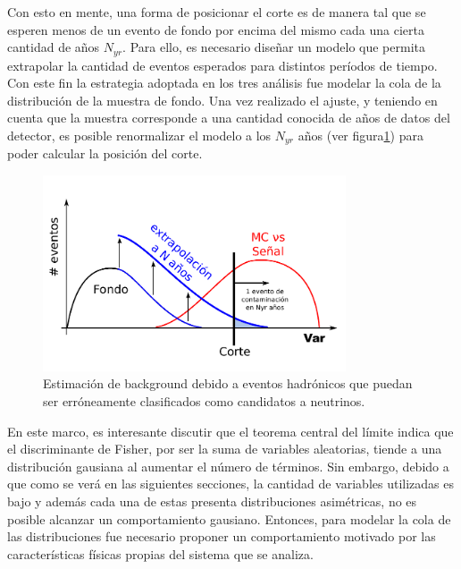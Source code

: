 	Con esto en mente, una forma de posicionar el corte es de manera tal que se esperen menos de un evento de fondo por encima del mismo cada una cierta cantidad de años $N_{yr}$.
	Para ello, es necesario diseñar un modelo que permita extrapolar la cantidad de eventos esperados para distintos períodos de tiempo.
	Con este fin la estrategia adoptada en los tres análisis fue modelar la cola de la distribución de la muestra de fondo.
	Una vez realizado el ajuste, y teniendo en cuenta que la muestra corresponde a una cantidad conocida de años de datos del detector, es posible renormalizar el modelo a los $N_{yr}$ años (ver  figura\ref{fig:estimaBackground}) para poder calcular la posición del corte.
	\begin{figure}[ht]
	\begin{center}
	\includegraphics[width=0.8\textwidth]{fig/seleccionAuger/estimaBackground.pdf}
	\caption{Estimación de background debido a eventos hadrónicos que puedan ser erróneamente clasificados como candidatos a neutrinos.}
	\label{fig:estimaBackground}
	\end{center}
	\end{figure}
	
	En este marco, es interesante discutir que el teorema central del límite indica que el discriminante de Fisher, por ser la suma de variables aleatorias, tiende a una distribución gausiana al aumentar el número de términos.
	Sin embargo, debido a que como se verá en las siguientes secciones, la cantidad de variables utilizadas es bajo y además cada una de estas presenta distribuciones asimétricas, no es posible alcanzar un comportamiento gausiano.
	Entonces, para modelar la cola de las distribuciones fue necesario proponer un comportamiento motivado por las características físicas propias del sistema que se analiza.
	
